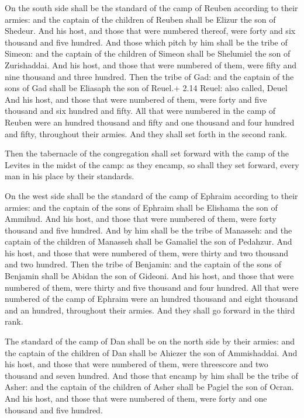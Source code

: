  On the south side shall be the standard of the camp of
Reuben according to their armies: and the captain of the children of
Reuben shall be Elizur the son of Shedeur.  And his host,
and those that were numbered thereof, were forty and six thousand and
five hundred.  And those which pitch by him shall be the
tribe of Simeon: and the captain of the children of Simeon shall be
Shelumiel the son of Zurishaddai.  And his host, and those
that were numbered of them, were fifty and nine thousand and three
hundred.  Then the tribe of Gad: and the captain of the
sons of Gad shall be Eliasaph the son of Reuel.+ 2.14 Reuel: also
called, Deuel  And his host, and those that were numbered
of them, were forty and five thousand and six hundred and fifty.
 All that were numbered in the camp of Reuben were an
hundred thousand and fifty and one thousand and four hundred and fifty,
throughout their armies. And they shall set forth in the second rank.

 Then the tabernacle of the congregation shall set
forward with the camp of the Levites in the midst of the camp: as they
encamp, so shall they set forward, every man in his place by their
standards.

 On the west side shall be the standard of the camp of
Ephraim according to their armies: and the captain of the sons of
Ephraim shall be Elishama the son of Ammihud.  And his
host, and those that were numbered of them, were forty thousand and five
hundred.  And by him shall be the tribe of Manasseh: and
the captain of the children of Manasseh shall be Gamaliel the son of
Pedahzur.  And his host, and those that were numbered of
them, were thirty and two thousand and two hundred.  Then
the tribe of Benjamin: and the captain of the sons of Benjamin shall be
Abidan the son of Gideoni.  And his host, and those that
were numbered of them, were thirty and five thousand and four hundred.
 All that were numbered of the camp of Ephraim were an
hundred thousand and eight thousand and an hundred, throughout their
armies. And they shall go forward in the third rank.

 The standard of the camp of Dan shall be on the north
side by their armies: and the captain of the children of Dan shall be
Ahiezer the son of Ammishaddai.  And his host, and those
that were numbered of them, were threescore and two thousand and seven
hundred.  And those that encamp by him shall be the tribe
of Asher: and the captain of the children of Asher shall be Pagiel the
son of Ocran.  And his host, and those that were numbered
of them, were forty and one thousand and five hundred.

